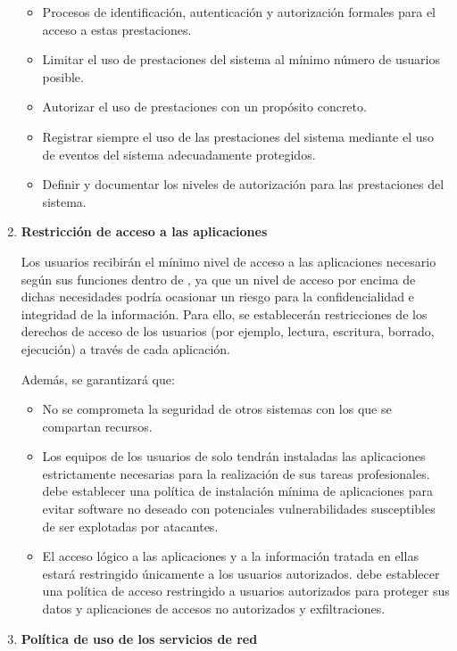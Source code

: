\begin{enumerate}[label=\alph*)]
    \begin{itemize}
        \item Procesos de identificación, autenticación y autorización formales para el acceso a estas prestaciones.
        \item Limitar el uso de prestaciones del sistema al mínimo número de usuarios posible.
        \item Autorizar el uso de prestaciones con un propósito concreto.
        \item Registrar siempre el uso de las prestaciones del sistema mediante el uso de eventos del sistema adecuadamente protegidos.
        \item Definir y documentar los niveles de autorización para las prestaciones del sistema.
    \end{itemize}

    \item \textbf{Restricción de acceso a las aplicaciones}

    Los usuarios recibirán el mínimo nivel de acceso a las aplicaciones necesario según sus funciones dentro de \Beneficiario{}, ya que un nivel de acceso por encima de dichas necesidades podría ocasionar un riesgo para la confidencialidad e integridad de la información. Para ello, se establecerán restricciones de los derechos de acceso de los usuarios (por ejemplo, lectura, escritura, borrado, ejecución) a través de cada aplicación.

    Además, se garantizará que:
    \begin{itemize}
        \item No se comprometa la seguridad de otros sistemas con los que se compartan recursos.
        \item Los equipos de los usuarios de \Beneficiario{} solo tendrán instaladas las aplicaciones estrictamente necesarias para la realización de sus tareas profesionales. \Beneficiario{} debe establecer una política de instalación mínima de aplicaciones para evitar software no deseado con potenciales vulnerabilidades susceptibles de ser explotadas por atacantes.
        \item El acceso lógico a las aplicaciones y a la información tratada en ellas estará restringido únicamente a los usuarios autorizados. \Beneficiario{} debe establecer una política de acceso restringido a usuarios autorizados para proteger sus datos y aplicaciones de accesos no autorizados y exfiltraciones.
    \end{itemize}

    \item \textbf{Política de uso de los servicios de red}


\end{enumerate}
